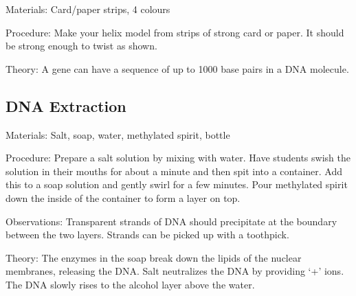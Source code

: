 \begin{multicols}{2}
\begin{description*}
\item[Materials:]{Card/paper strips, 4 colours}
\item[Procedure:]{Make your helix model
from strips of strong card or
paper. It should be strong enough
to twist as shown.}
\item[Theory:]{A gene can have a sequence of up
to 1000 base pairs in a DNA
molecule. }
\end{description*}

\subsection{DNA Extraction} %


\begin{description*}
\item[Materials:]{Salt, soap, water, methylated spirit, bottle}
\item[Procedure:]{Prepare a salt solution by mixing with water. Have students swish the solution in their mouths for about a minute and then spit into a container. Add this to a soap solution and gently swirl for a few minutes. Pour methylated spirit down the inside of the container to form a layer on top.}
\item[Observations:]{Transparent strands of DNA should precipitate at the boundary between the two layers. Strands can be picked up with a toothpick.}
\item[Theory:]{The enzymes in the soap break down the lipids of the nuclear membranes, releasing the DNA. Salt neutralizes the DNA by providing `+' ions. The DNA slowly rises to the alcohol layer above the water.}
\end{description*}


\end{multicols}
